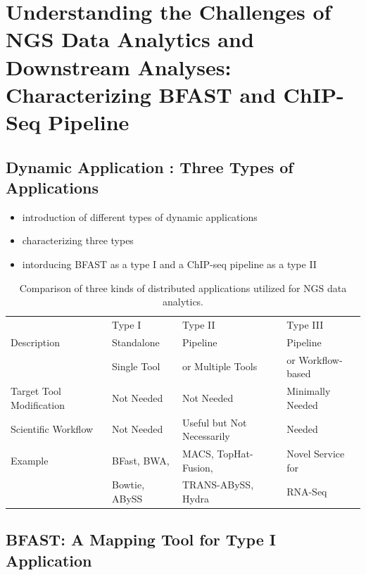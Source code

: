 \documentclass{cpeauth}
\begin{document}
\section{Understanding the Challenges of NGS Data Analytics and Downstream Analyses: Characterizing BFAST and ChIP-Seq Pipeline}

\subsection{Dynamic Application : Three Types of Applications}
\begin{itemize}
\item  introduction of different types of dynamic applications
\item  characterizing three types
\item  intorducing BFAST as a type I and a ChIP-seq pipeline as a type II
\end{itemize}


\begin{table}[!h]
\begin{center}
 \caption{Comparison of three kinds of distributed applications utilized for NGS data analytics. %
 }
\begin{tabular}{| l | l | l | l |} \hline \rowcolor[rgb]{0.8,0.8,0.8} &
Type I & Type II & Type III \\ Description & Standalone  & Pipeline & Pipeline \\ 
& Single Tool  & or Multiple Tools &  or Workflow-based \\\hline 
Target Tool Modification & Not Needed &
Not Needed & Minimally Needed \\ \hline Scientific Workflow & Not Needed & Useful but Not Necessarily &
Needed \\ \hline 
Example & BFast, BWA,  & MACS, TopHat-Fusion,  &   Novel Service for 
 \\
 &  Bowtie, ABySS  & TRANS-ABySS, Hydra & RNA-Seq \\
\hline
\end{tabular}
\label{table:three-type-service}
\end{center}
\end{table}


\subsection{BFAST: A Mapping Tool for Type I Application}
\end{document}

